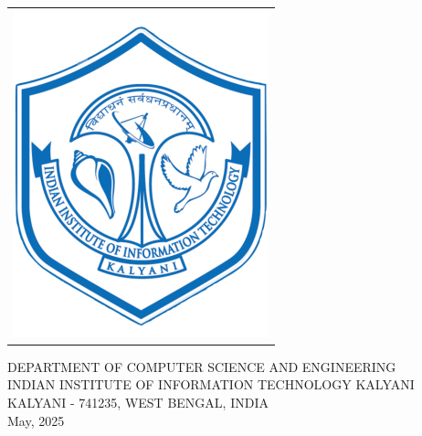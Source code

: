 \begin{center}
  \begin{tabular}{l}
    \includegraphics[width = 3.5 cm]{Figure/header/IIITK.png}
  \end{tabular}
\end{center}
\vspace{-0.3cm}
\begin{center}
  \begin{large}
    \vspace{0.25cm}
 \hspace{-3.5mm}DEPARTMENT OF COMPUTER SCIENCE AND ENGINEERING \\ 
 \hspace{-7.5mm} INDIAN INSTITUTE OF INFORMATION TECHNOLOGY KALYANI\\[0.35cm]
 KALYANI - 741235, WEST BENGAL, INDIA\\
 \vskip 40pt
 May, 2025
  \end{large}
\end{center}


